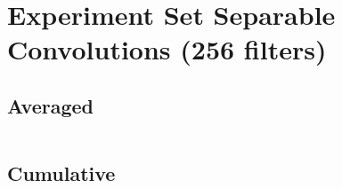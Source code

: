 \documentclass{article}%
\begin{document}
%
\normalsize%
\section{Experiment Set Separable Convolutions (256 filters)}%
\label{sec:Experiment Set Separable Convolutions (256 filters)}%
\subsection{Averaged}%
\label{subsec:Averaged}%
\begin{tabular}{|r|c|}%
\hline%
\end{tabular}

%
\subsection{Cumulative}%
\label{subsec:Cumulative}%
\begin{tabular}{|r|c|}%
\hline%
\end{tabular}

%
\end{document}
